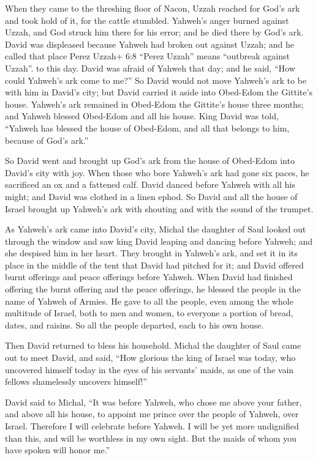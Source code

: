  When they came to the threshing floor of Nacon, Uzzah
reached for God's ark and took hold of it, for the cattle stumbled.
 Yahweh's anger burned against Uzzah, and God struck him
there for his error; and he died there by God's ark.  David
was displeased because Yahweh had broken out against Uzzah; and he
called that place Perez Uzzah+ 6:8 ``Perez Uzzah'' means ``outbreak
against Uzzah''. to this day.  David was afraid of Yahweh
that day; and he said, ``How could Yahweh's ark come to me?''
 So David would not move Yahweh's ark to be with him in
David's city; but David carried it aside into Obed-Edom the Gittite's
house.  Yahweh's ark remained in Obed-Edom the Gittite's
house three months; and Yahweh blessed Obed-Edom and all his house.
 King David was told, ``Yahweh has blessed the house of
Obed-Edom, and all that belongs to him, because of God's ark.''

So David went and brought up God's ark from the house of Obed-Edom into
David's city with joy.  When those who bore Yahweh's ark
had gone six paces, he sacrificed an ox and a fattened calf.
 David danced before Yahweh with all his might; and David
was clothed in a linen ephod.  So David and all the house
of Israel brought up Yahweh's ark with shouting and with the sound of
the trumpet.

 As Yahweh's ark came into David's city, Michal the
daughter of Saul looked out through the window and saw king David
leaping and dancing before Yahweh; and she despised him in her heart.
 They brought in Yahweh's ark, and set it in its place in
the middle of the tent that David had pitched for it; and David offered
burnt offerings and peace offerings before Yahweh.  When
David had finished offering the burnt offering and the peace offerings,
he blessed the people in the name of Yahweh of Armies.  He
gave to all the people, even among the whole multitude of Israel, both
to men and women, to everyone a portion of bread, dates, and raisins. So
all the people departed, each to his own house.

 Then David returned to bless his household. Michal the
daughter of Saul came out to meet David, and said, ``How glorious the
king of Israel was today, who uncovered himself today in the eyes of his
servants' maids, as one of the vain fellows shamelessly uncovers
himself!''

 David said to Michal, ``It was before Yahweh, who chose me
above your father, and above all his house, to appoint me prince over
the people of Yahweh, over Israel. Therefore I will celebrate before
Yahweh.  I will be yet more undignified than this, and will
be worthless in my own sight. But the maids of whom you have spoken will
honor me.''

